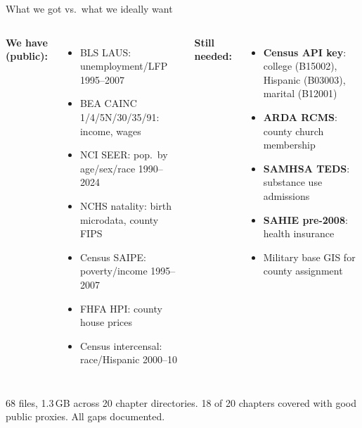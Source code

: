 \documentclass[aspectratio=169,12pt]{beamer}
\begin{document}
\begin{frame}{What we got vs.\ what we ideally want}

\begin{columns}[t]
  \textbf{\color{CypressGreen}We have (public):}
  \begin{itemize}\scriptsize\setlength{\itemsep}{1pt}
    \item BLS LAUS: unemployment/LFP 1995--2007
    \item BEA CAINC 1/4/5N/30/35/91: income, wages
    \item NCI SEER: pop.\ by age/sex/race 1990--2024
    \item NCHS natality: birth microdata, county FIPS
    \item Census SAIPE: poverty/income 1995--2007
    \item FHFA HPI: county house prices
    \item Census intercensal: race/Hispanic 2000--10
  \end{itemize}

  \textbf{\color{Terracotta}Still needed:}
  \begin{itemize}\scriptsize\setlength{\itemsep}{1pt}
    \item \textbf{Census API key}: college (B15002),\\Hispanic (B03003), marital (B12001)
    \item \textbf{ARDA RCMS}: county church membership
    \item \textbf{SAMHSA TEDS}: substance use admissions
    \item \textbf{SAHIE pre-2008}: health insurance
    \item Military base GIS for county assignment
  \end{itemize}
\end{columns}

\vspace{0.2em}
{\scriptsize\color{OldMortar}
68 files, 1.3\,GB across 20 chapter directories.
18 of 20 chapters covered with good public proxies. All gaps documented.}

\end{frame}

\end{document}
